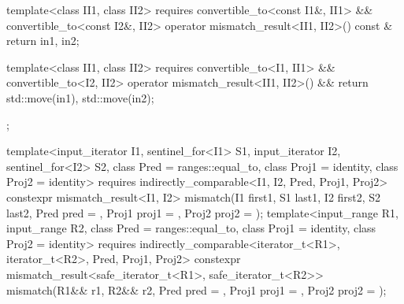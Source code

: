 \begin{codeblock}
{{{      template<class II1, class II2>
        requires convertible_to<const I1&, II1> && convertible_to<const I2&, II2>
        operator mismatch_result<II1, II2>() const & {
          return {in1, in2};
        }

      template<class II1, class II2>
        requires convertible_to<I1, II1> && convertible_to<I2, II2>
        operator mismatch_result<II1, II2>() && {
          return {std::move(in1), std::move(in2)};
        }
    };

    template<input_iterator I1, sentinel_for<I1> S1, input_iterator I2, sentinel_for<I2> S2,
             class Pred = ranges::equal_to, class Proj1 = identity, class Proj2 = identity>
      requires indirectly_comparable<I1, I2, Pred, Proj1, Proj2>
      constexpr mismatch_result<I1, I2>
        mismatch(I1 first1, S1 last1, I2 first2, S2 last2, Pred pred = {},
                 Proj1 proj1 = {}, Proj2 proj2 = {});
    template<input_range R1, input_range R2,
             class Pred = ranges::equal_to, class Proj1 = identity, class Proj2 = identity>
      requires indirectly_comparable<iterator_t<R1>, iterator_t<R2>, Pred, Proj1, Proj2>
      constexpr mismatch_result<safe_iterator_t<R1>, safe_iterator_t<R2>>
        mismatch(R1&& r1, R2&& r2, Pred pred = {},
                 Proj1 proj1 = {}, Proj2 proj2 = {});
  }

}
\end{codeblock}
